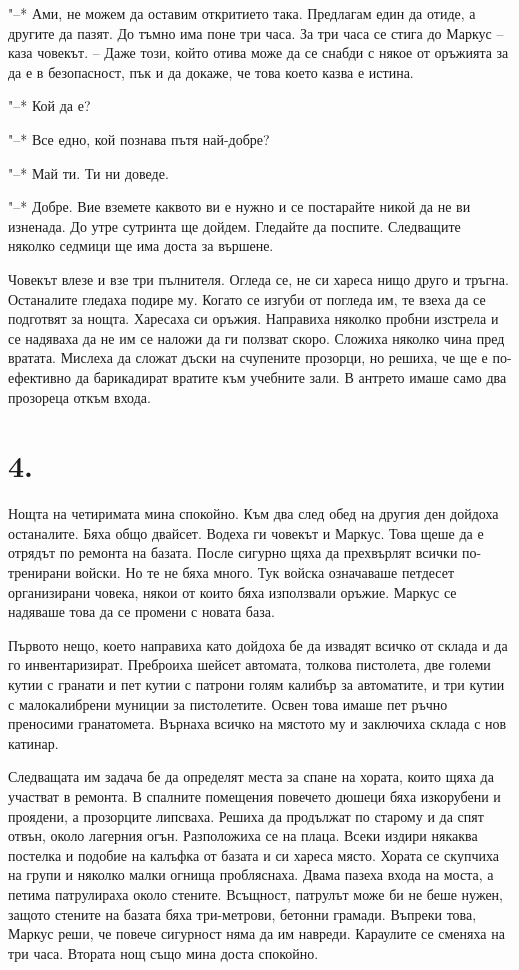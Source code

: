 \documentclass[ebook,openany,12pt]{memoir}
\begin{document}
"--* Ами, не можем да оставим откритието така. Предлагам един да отиде, а другите да пазят. До тъмно има поне три часа. За три часа се стига до Маркус – каза човекът. – Даже този, който отива може да се снабди с някое от оръжията за да е в безопасност, пък и да докаже, че това което казва е истина.

"--* Кой да е?

"--* Все едно, кой познава пътя най-добре?

"--* Май ти. Ти ни доведе.

"--* Добре. Вие вземете каквото ви е нужно и се постарайте никой да не ви изненада. До утре сутринта ще дойдем. Гледайте да поспите. Следващите няколко седмици ще има доста за вършене.

Човекът влезе и взе три пълнителя. Огледа се, не си хареса нищо друго и тръгна. Останалите гледаха подире му. Когато се изгуби от погледа им, те взеха да се подготвят за нощта. Харесаха си оръжия. Направиха няколко пробни изстрела и се надяваха да не им се наложи да ги ползват скоро. Сложиха няколко чина пред вратата. Мислеха да сложат дъски на счупените прозорци, но решиха, че ще е по-ефективно да барикадират вратите към учебните зали. В антрето имаше само два прозореца откъм входа.

\section*{4.}

Нощта на четиримата мина спокойно. Към два след обед на другия ден дойдоха останалите. Бяха общо двайсет. Водеха ги човекът и Маркус. Това щеше да е отрядът по ремонта на базата. После сигурно щяха да прехвърлят всички по-тренирани войски. Но те не бяха много. Тук войска означаваше петдесет организирани човека, някои от които бяха използвали оръжие. Маркус се надяваше това да се промени с новата база.

Първото нещо, което направиха като дойдоха бе да извадят всичко от склада и да го инвентаризират. Преброиха шейсет автомата, толкова пистолета, две големи кутии с гранати и пет кутии с патрони голям калибър за автоматите, и три кутии с малокалибрени муниции за пистолетите. Освен това имаше пет ръчно преносими гранатомета. Върнаха всичко на мястото му и заключиха склада с нов катинар.

Следващата им задача бе да определят места за спане на хората, които щяха да участват в ремонта. В спалните помещения повечето дюшеци бяха изкорубени и проядени, а прозорците липсваха. Решиха да продължат по старому и да спят отвън, около лагерния огън. Разположиха се на плаца. Всеки издири някаква постелка и подобие на калъфка от базата и си хареса място. Хората се скупчиха на групи и няколко малки огнища пробляснаха. Двама пазеха входа на моста, а петима патрулираха около стените. Всъщност, патрулът може би не беше нужен, защото стените на базата бяха три-метрови, бетонни грамади. Въпреки това, Маркус реши, че повече сигурност няма да им навреди. Караулите се сменяха на три часа. Втората нощ също мина доста спокойно.
\end{document}
